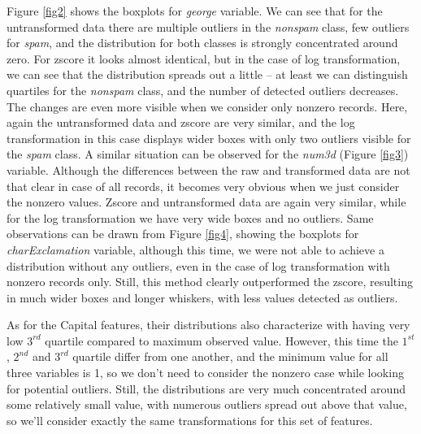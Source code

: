 \documentclass{article}\usepackage[]{graphicx}\usepackage[]{xcolor}
\begin{document}
Figure \ref{fig2} shows the boxplots for \textit{george} variable. We can see that for the untransformed
data there are multiple outliers in the \textit{nonspam} class, few outliers for \textit{spam}, and
the distribution for both classes is strongly concentrated around zero. For zscore it looks almost
identical, but in the case of log transformation, we can see that the distribution spreads 
out a little -- at least we can distinguish quartiles for the \textit{nonspam} class, and the number
of detected outliers decreases. The changes are even more visible when we consider only nonzero records.
Here, again the untransformed data and zscore are very similar, and the log transformation in this case
displays wider boxes with only two outliers visible for the \textit{spam} class.
A similar situation can be observed for the \textit{num3d} (Figure \ref{fig3}) variable. Although the differences
between the raw and transformed data are not that clear in case of all records, 
it becomes very obvious when we just consider the nonzero values. Zscore and untransformed data
are again very similar, while for the log transformation we have very wide boxes and no 
outliers. Same observations can be drawn from Figure \ref{fig4}, showing the boxplots
for \textit{charExclamation} variable, although this time, we were not able to achieve a distribution without any outliers,
even in the case of log transformation with nonzero records only. Still, this method
clearly outperformed the zscore, resulting in much wider boxes and longer whiskers,
with less values detected as outliers.

As for the Capital features, their distributions also characterize with having
very low $3^{rd}$ quartile compared to maximum observed value. However, this time 
the $1^{st}$, $2^{nd}$ and $3^{rd}$ quartile differ from one another, and the
minimum value for all three variables is 1, so we don't need to consider the nonzero
case while looking for potential outliers. Still, the distributions are very much concentrated
around some relatively small value, with numerous outliers spread out above that value,
so we'll consider exactly the same transformations for this set of features.
\end{document}
